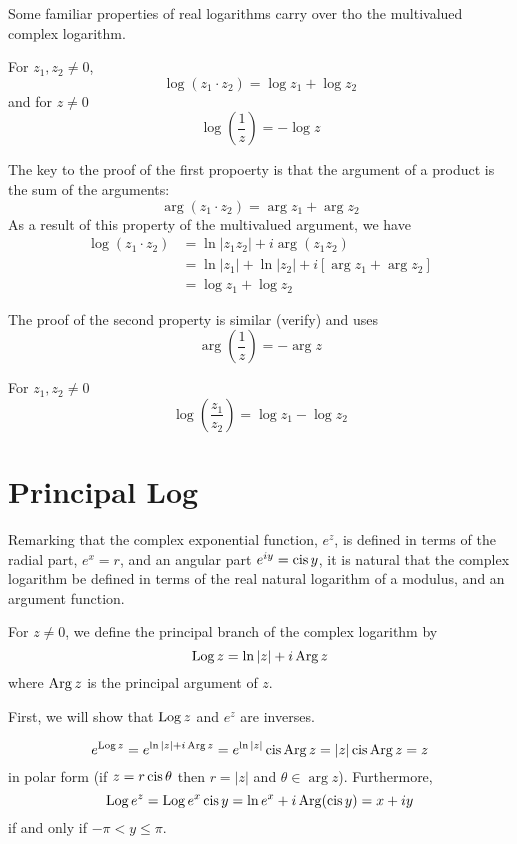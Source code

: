 \documentclass[handout]{ximera}
\begin{document}
Some familiar properties of real logarithms carry over tho the multivalued complex logarithm.

\begin{proposition}
For $z_1, z_2 \neq 0$, 
\[
\log(z_1\cdot z_2) = \log z_1 + \log z_2
\]
and for $z \neq 0$
\[
\log\left(\frac{1}{z}\right) = - \log z
\]
\end{proposition}
The key to the proof of the first propoerty is that the argument of a product is the sum of the arguments:
\[
\arg(z_1 \cdot z_2) = \arg z_1 + \arg z_2
\]
As a result of this property of the multivalued argument, we have
\begin{align*}
\log(z_1\cdot z_2) &= \ln|z_1 z_2| + i\arg(z_1 z_2)\\
&= \ln|z_1| + \ln|z_2| + i\left[\arg z_1 + \arg z_2\right]\\
&= \log z_1 + \log z_2
\end{align*}

The proof of the second property is similar (verify) and uses
\[
\arg\left(\frac{1}{z}\right) = -\arg z
\]

\begin{corollary}
For $z_1, z_2 \neq 0$
\[
\log\left(\frac{z_1}{z_2}\right) = \log z_1 - \log z_2
\]
\end{corollary}

\section{Principal Log}

Remarking that the complex exponential function, $e^z$, is defined in terms of the radial part, $e^x=r$,
and an angular part $e^{iy}= \operatorname{cis} y$, it is natural that the complex logarithm be defined in terms of the real natural logarithm of a modulus,
and an argument function.

\begin{definition}[$\Log z$]
For $z \neq 0$, we define the principal branch of the complex logarithm by
\[
\operatorname{Log} z =  \ln|z| + i\operatorname{Arg} z
\]
where $\operatorname{Arg} z$ is the principal argument of $z$. 
\end{definition}

 

First, we will show that $\Log z$ and $e^z$ are inverses.


\[
e^{\operatorname{Log} z} = e^{\ln |z| + i\operatorname{Arg} z} = e^{\ln |z|} \operatorname{cis} \operatorname{Arg} z = |z| \operatorname{cis} \operatorname{Arg} z =z
\]
in polar form (if $z=r\operatorname{cis} \theta$ then $r = |z|$ and $\theta \in \arg z$).
Furthermore,
\[
\operatorname{Log} e^z = \operatorname{Log} e^x\operatorname{cis} y = \ln e^x + i\operatorname{Arg}(\operatorname{cis} y) = x+iy
\]
if and only if $-\pi < y \leq \pi$.
\end{document}
